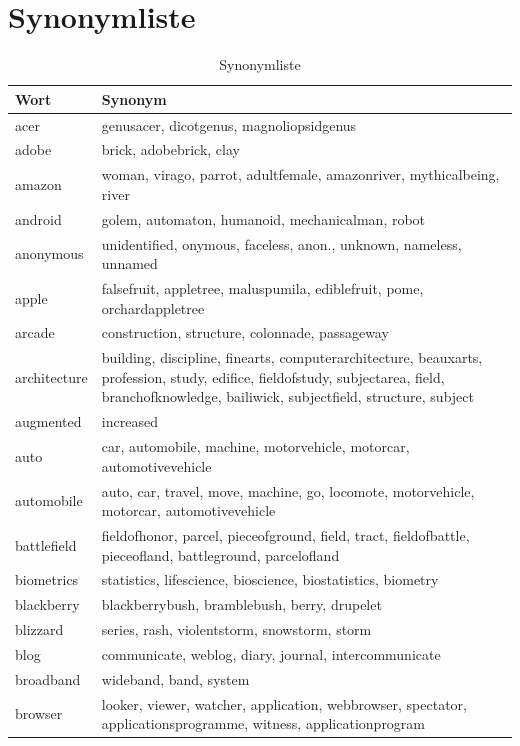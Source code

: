 \documentclass[12pt,a4paper]{report}
\begin{document}
\section{Synonymliste}	
	\label{sec:Synonymliste}
	\begin{table}[H]
\caption{Synonymliste}
\begin{center}
\begin{tabular}{|l|l|}
\hline
Wort & Synonym\\
\hline
acer & genusacer, dicotgenus, magnoliopsidgenus\\
\hline
adobe & brick, adobebrick, clay\\
\hline
amazon & woman, virago, parrot, adultfemale, amazonriver, mythicalbeing, river\\
\hline
android & golem, automaton, humanoid, mechanicalman, robot\\
\hline
anonymous & unidentified, onymous, faceless, anon., unknown, nameless, unnamed\\
\hline
apple & falsefruit, appletree, maluspumila, ediblefruit, pome, orchardappletree\\
\hline
arcade & construction, structure, colonnade, passageway\\
\hline
architecture & building, discipline, finearts, computerarchitecture, beauxarts, profession, study, edifice, fieldofstudy, subjectarea, field, branchofknowledge, bailiwick, subjectfield, structure, subject\\
\hline
augmented & increased\\
\hline
auto & car, automobile, machine, motorvehicle, motorcar, automotivevehicle\\
\hline
automobile & auto, car, travel, move, machine, go, locomote, motorvehicle, motorcar, automotivevehicle\\
\hline
battlefield & fieldofhonor, parcel, pieceofground, field, tract, fieldofbattle, pieceofland, battleground, parcelofland\\
\hline
biometrics & statistics, lifescience, bioscience, biostatistics, biometry\\
\hline
blackberry & blackberrybush, bramblebush, berry, drupelet\\
\hline
blizzard & series, rash, violentstorm, snowstorm, storm\\
\hline
blog & communicate, weblog, diary, journal, intercommunicate\\
\hline
broadband & wideband, band, system\\
\hline
browser & looker, viewer, watcher, application, webbrowser, spectator, applicationsprogramme, witness, applicationprogram\\

\end{tabular}
\end{center}
\end{table}
\end{document}
